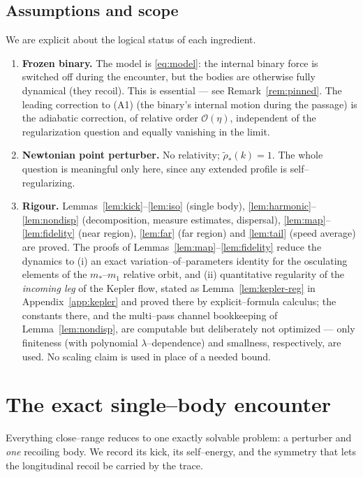 \documentclass[11pt]{article}
\newcommand{\order}[1]{\mathcal O\!\left(#1\right)}
\begin{document}
\subsection{Assumptions and scope}
\label{sec:scope}
We are explicit about the logical status of each ingredient.
\begin{enumerate}
\item[(A1)] \textbf{Frozen binary.} The model is \eqref{eq:model}: the internal binary force is
switched off during the encounter, but the bodies are otherwise fully dynamical (they recoil). This
is essential --- see Remark~\ref{rem:pinned}. The leading correction to (A1) (the binary's internal
motion during the passage) is the adiabatic correction, of relative order $\order\eta$, independent
of the regularization question and equally vanishing in the limit.
\item[(A2)] \textbf{Newtonian point perturber.} No relativity; $\tilde\rho_*(k)=1$. The whole
question is meaningful only here, since any extended profile is self--regularizing.
\item[(A3)] \textbf{Rigour.} Lemmas~\ref{lem:kick}--\ref{lem:iso} (single body),
\ref{lem:harmonic}--\ref{lem:nondisp} (decomposition, measure estimates, dispersal),
\ref{lem:map}--\ref{lem:fidelity} (near region), \ref{lem:far} (far region) and \ref{lem:tail}
(speed average) are proved. The proofs of Lemmas~\ref{lem:map}--\ref{lem:fidelity} reduce the
dynamics to (i) an exact variation--of--parameters identity for the osculating elements of the
$m_*$--$m_1$ relative orbit, and (ii) quantitative regularity of the \emph{incoming leg} of the
Kepler flow, stated as Lemma~\ref{lem:kepler-reg} in Appendix~\ref{app:kepler} and proved there by
explicit--formula calculus; the constants there, and the multi--pass channel bookkeeping of
Lemma~\ref{lem:nondisp}, are computable but deliberately not optimized --- only finiteness (with
polynomial $\lambda$--dependence) and smallness, respectively, are used. No scaling
claim is used in place of a needed bound.
\end{enumerate}

\section{The exact single--body encounter}
\label{sec:onebody}

Everything close--range reduces to one exactly solvable problem: a perturber and \emph{one}
recoiling body. We record its kick, its self--energy, and the symmetry that lets the longitudinal
recoil be carried by the trace.
\end{document}
